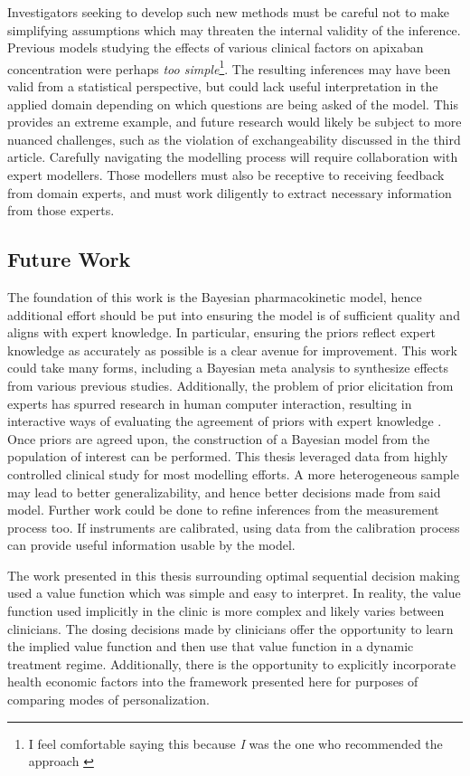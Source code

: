 Investigators seeking to develop such new methods must be careful not to make simplifying assumptions which may threaten the internal validity of the inference. Previous models studying the effects of various clinical factors on apixaban concentration were perhaps \textit{too simple}\footnote{I feel comfortable saying this because \textit{I} was the one who recommended the approach \cite{gulilat_drug_2020}}.  The resulting inferences may have been valid from a statistical perspective, but could lack useful interpretation in the applied domain depending on which questions are being asked of the model.  This provides an extreme example, and future research would likely be subject to more nuanced challenges, such as the violation of exchangeability discussed in the third article. Carefully navigating the modelling process will require collaboration with expert modellers.  Those modellers must also be receptive to receiving feedback from domain experts, and must work diligently to extract necessary information from those experts.


\subsection{Future Work}

The foundation of this work is the Bayesian pharmacokinetic model, hence additional effort should be put into ensuring the model is of sufficient quality and aligns with expert knowledge.  In particular, ensuring the priors reflect expert knowledge as accurately as possible is a clear avenue for improvement.  This work could take many forms, including a Bayesian meta analysis to synthesize effects from various previous studies.  Additionally, the problem of prior elicitation from experts has spurred research in human computer interaction, resulting in interactive ways of evaluating the agreement of priors with expert knowledge \cite{sarma2020prior}.  Once priors are agreed upon, the construction of a Bayesian model from the population of interest can be performed.  This thesis leveraged data from highly controlled clinical study for most modelling efforts.  A more heterogeneous sample may lead to better generalizability, and hence better decisions made from said model.  Further work could be done to refine inferences from the measurement process too.  If instruments are calibrated, using data from the calibration process can provide useful information usable by the model.

The work presented in this thesis surrounding optimal sequential decision making used a value function which was simple and easy to interpret.  In reality, the value function used implicitly in the clinic is more complex and likely varies between clinicians.  The dosing decisions made by clinicians offer the opportunity to learn the implied value function and then use that value function in a dynamic treatment regime.  Additionally, there is the opportunity to explicitly incorporate health economic factors into the  framework presented here for purposes of comparing modes of personalization.


